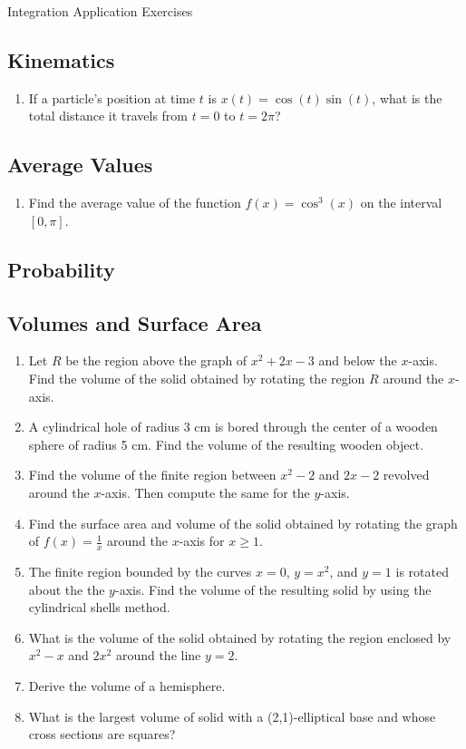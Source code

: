 \documentclass{article}
\begin{document}
\begin{center}
\begin{Huge}Integration Application Exercises\end{Huge}
\end{center}


\subsection{Kinematics}
\begin{enumerate}
\item If a particle's position at time $t$ is $x(t)=\cos(t)\sin(t)$, what is the total distance it travels from $t=0$ to $t=2\pi$?
\end{enumerate}


\subsection{Average Values}
\begin{enumerate}
\item Find the average value of the function $f(x) = \cos^3(x)$ on the interval $[0,\pi]$.

\end{enumerate}

\subsection{Probability}


\subsection{Volumes and Surface Area}
\begin{enumerate}
\item Let $R$ be the region above the graph of $x^2+2x-3$ and below the $x$-axis. Find the volume of the solid obtained by rotating the region $R$ around the $x$-axis.
\item A cylindrical hole of radius 3 cm is bored through the center of a wooden sphere of radius 5 cm. Find the volume of the resulting wooden object.
\item Find the volume of the finite region between $x^2-2$ and $2x-2$ revolved around the $x$-axis. Then compute the same for the $y$-axis.
\item Find the surface area and volume of the solid obtained by rotating the graph of $f(x)=\frac{1}{x}$ around the $x$-axis for $x\geq1$.
\item The finite region bounded by the curves $x = 0$, $y = x^2$, and $y = 1$ is rotated about the the $y$-axis. Find the volume of the resulting solid by using the cylindrical shells method.
\item What is the volume of the solid obtained by rotating the region enclosed by $x^2-x$ and $2x^2$ around the line $y=2$.
\item Derive the volume of a hemisphere.
\item What is the largest volume of solid with a (2,1)-elliptical base and whose cross sections are squares?
\end{enumerate}
\end{document}
